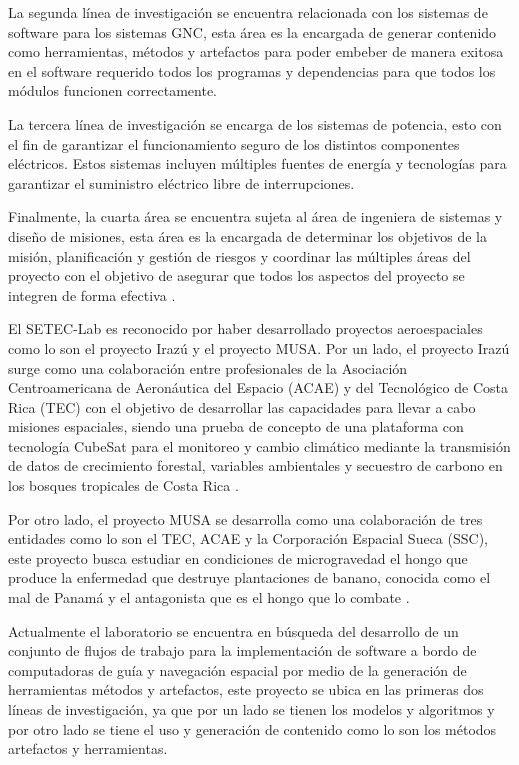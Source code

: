 \documentclass[12pt]{article}
\begin{document}
La segunda línea de investigación se encuentra relacionada con los sistemas de software para los sistemas GNC, esta área es la encargada de generar contenido como herramientas, métodos y artefactos para poder embeber de manera exitosa en el software requerido todos los programas y dependencias para que todos los módulos funcionen correctamente.

La tercera línea de investigación se encarga de los sistemas de potencia, esto con el fin de garantizar el funcionamiento seguro de los distintos componentes eléctricos. Estos sistemas incluyen múltiples fuentes de energía y tecnologías para garantizar el suministro eléctrico libre de interrupciones.

Finalmente, la cuarta área se encuentra sujeta al área de ingeniera de sistemas y diseño de misiones, esta área es la encargada de determinar los objetivos de la misión, planificación y gestión de riesgos y coordinar las múltiples áreas del proyecto con el objetivo de asegurar que todos los aspectos del proyecto se integren de forma efectiva \cite{Balaram2008}.


El SETEC-Lab es reconocido por haber desarrollado proyectos aeroespaciales como lo son el proyecto Irazú y el proyecto MUSA. Por un lado, el proyecto Irazú surge como una colaboración entre profesionales de la Asociación Centroamericana de Aeronáutica del Espacio (ACAE) y del Tecnológico de Costa Rica (TEC) con el objetivo de desarrollar las capacidades para llevar a cabo misiones espaciales, siendo una prueba de concepto de una plataforma con tecnología CubeSat para el monitoreo y cambio climático mediante la transmisión de datos de crecimiento forestal, variables ambientales y secuestro de carbono en los bosques tropicales de Costa Rica \cite{TecCR2023_Satelite}.

Por otro lado, el proyecto MUSA se desarrolla como una colaboración de tres entidades como lo son el TEC, ACAE y la Corporación Espacial Sueca (SSC), este proyecto busca estudiar en condiciones de microgravedad el hongo que produce la enfermedad que destruye plantaciones de banano, conocida como el mal de Panamá y el antagonista que es el hongo que lo combate \cite{TecCR2023_MUSA}.

Actualmente el laboratorio se encuentra en búsqueda del desarrollo de un conjunto de flujos de trabajo para la implementación de software a bordo de computadoras de guía y navegación espacial por medio de la generación de herramientas métodos y artefactos, este proyecto se ubica en las primeras dos líneas de investigación, ya que por un lado se tienen los modelos y algoritmos y por otro lado se tiene el uso y generación de contenido como lo son los métodos artefactos y herramientas.
\end{document}
